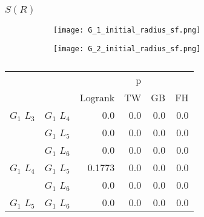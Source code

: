      

      \newpage
      

      \subsubsection{$S(R)$}
      
      \begin{figure}
        \centering
        
        \begin{subfigure}[b]{0.45\textwidth}
          \texttt{[image: G\_1\_initial\_radius\_sf.png]}
          \caption{}
          \label{fig:sf_g1_branch_radius}
        \end{subfigure}
        \hfill
        \begin{subfigure}[b]{0.45\textwidth}
          \texttt{[image: G\_2\_initial\_radius\_sf.png]}
          \caption{}
          \label{fig:sf_g2_branch_radius}
        \end{subfigure}

        \caption{}
        \label{fig:sf_branch_radius}

      \end{figure}

      
      \begin{table}
        \centering
        \begin{tabular}{llrrrr}
          \toprule
                       &             &         &  p &    &     \\
          \cmidrule{3-6}
                       &             & Logrank & TW & GB & FH  \\
          \midrule
          $G_1$ $L_3$  & $G_1$ $L_4$  &  0.0 &  0.0 &  0.0 &  0.0     \\
                       & $G_1$ $L_5$  & 0.0 & 0.0 & 0.0 & 0.0    \\
                       & $G_1$ $L_6$  & 0.0 & 0.0 & 0.0 & 0.0      \\
          $G_1$ $L_4$  & $G_1$ $L_5$  & 0.1773 & 0.0 & 0.0 & 0.0      \\
                       & $G_1$ $L_6$  & 0.0 & 0.0 & 0.0 & 0.0       \\
          $G_1$ $L_5$   & $G_1$ $L_6$ & 0.0 &  0.0 & 0.0 & 0.0      \\
          \bottomrule
        \end{tabular}
        \label{tab:g1_ingroup_tests_radius}
        \caption{}
      \end{table}


